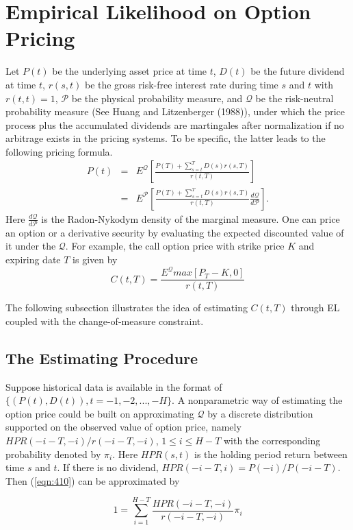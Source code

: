 \section{Empirical Likelihood on Option Pricing}
Let $P(t)$ be the underlying asset price at time $t$, $D(t)$ be the future dividend at time $t$, $r(s,t)$ be the gross risk-free interest rate during time $s$ and $t$ with $r(t,t)=1$,  $\mathcal{P}$ be the physical probability measure, and $\mathcal{Q}$ be the risk-neutral probability measure (See Huang and Litzenberger  (1988)), under which the price process plus the accumulated dividends are martingales after normalization if no arbitrage exists in the pricing systems. To be specific, the latter leads to the following pricing formula.
\begin{eqnarray}
P(t)&=&E^{\mathcal{Q}}[\frac{P(T)+\sum_{s=t}^{T}D(s)r(s,T)}{r(t,T)}]\label{eqn:410}\\
&=&E^{\mathcal{P}}[\frac{P(T)+\sum_{s=t}^{T}D(s)r(s,T)}{r(t,T)}\frac{d\mathcal{Q}}{d\mathcal{P}}].\nonumber
\end{eqnarray}
Here $\frac{d\mathcal{Q}}{d\mathcal{P}}$ is the Radon-Nykodym density of the marginal measure. One can price an option or a derivative security by evaluating the expected discounted value of it under the $\mathcal{Q}$. For example, the call option price with strike price $K$ and expiring date $T$ is given by
\begin{equation}\label{eqn:4102}
C(t,T)=\frac{E ^{\mathcal{Q}}  max[P_T - K,0]   }{r(t,T)} 
\end{equation} 

The following subsection illustrates the idea of estimating $C(t,T)$  through EL coupled with the change-of-measure constraint. 

\subsection{The Estimating Procedure}
Suppose historical data is available in the format of $\{(P(t),D(t)),t=-1,-2,...,-H\}$. A nonparametric way of estimating the option price could be built on approximating $\mathcal{Q}$ by a discrete distribution supported on the observed value of option price, namely $HPR(-i-T,-i)/r(-i-T,-i)$, $1\leq i\leq H-T$ with the corresponding probability denoted by $\pi_i$. Here $HPR(s,t)$ is the holding period return between time $s$ and $t$. If there is no dividend, $HPR(-i-T,i)=P(-i)/P(-i-T)$. Then (\ref{eqn:410}) can be approximated by 

\begin{equation}\label{eqn:4103}
1=\sum_{i=1}^{H-T} \frac{HPR(-i-T,-i)}{r(-i-T,-i)}\pi_i
\end{equation}

